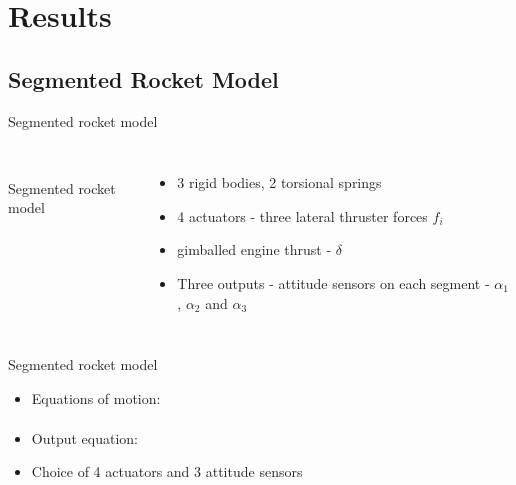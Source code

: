 \documentclass{beamer}
\begin{document}
\section{Results}

\subsection{Segmented Rocket Model}

\begin{frame}{Segmented rocket model}
\begin{columns}
\centering
 \\
Segmented rocket model
\begin{itemize}
\item 3 rigid bodies, 2 torsional springs
\item 4 actuators - three lateral thruster forces $f_i$
\item gimballed engine thrust - $\delta$
\item Three outputs - attitude sensors on each segment - $\alpha_1$, $\alpha_2$ and $\alpha_3$
\end{itemize}
\end{columns}
\end{frame}

\begin{frame}{Segmented rocket model}
\begin{itemize}
\item Equations of motion:
\begin{multline}

\end{multline}
\item Output equation:
\begin{equation}

\end{equation}
\item Choice of 4 actuators and 3 attitude sensors
\end{itemize}
\end{frame}
\end{document}
